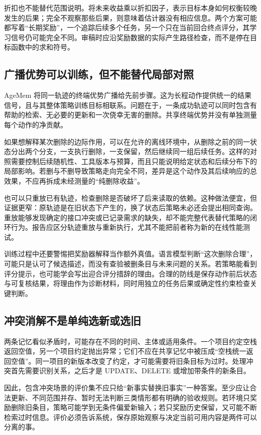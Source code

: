 折扣也不能替代范围说明。将未来收益乘以折扣因子，表示目标本身如何权衡较晚发生的后果；完全不观察那些后果，则意味着估计器没有相应信息。两个方案可能都写着“长期奖励”，一个追踪后续多个任务，另一个只在当前回合终点评分，其学习信号仍可能完全不同。审稿时应沿奖励数据的实际产生路径检查，而不是停在目标函数中的求和符号。

\subsection{广播优势可以训练，但不能替代局部对照}

AgeMem 将同一轨迹的终端优势广播给先前步骤\cite{agemem-2601}。这为长程动作提供统一的结果信号，且与其整体策略训练目标相联系。问题在于，一条成功轨迹可以同时包含有帮助的检索、无必要的更新和一次侥幸无害的删除。共享终端优势并没有单独测量每个动作的净贡献。

如果想解释某次删除的边际作用，可以在允许的离线环境中，从删除之前的同一状态分出两个分支，一支执行删除，一支保留，然后继续同一组后续任务。这样的对照需要控制后续随机性、工具版本与预算，而且只能说明给定状态和后续分布下的局部影响。若删与不删导致策略走向完全不同，差异是这个动作及其后续响应的总效果，不应再拆成未经测量的“纯删除收益”。

也可以只重放已有轨迹，检查删除是否破坏了后来读取的依赖。这种做法便宜，但证据更窄：原轨迹是在旧状态下产生的，换了状态后策略未必还会提出相同查询。重放能够发现确定的接口冲突或已记录需求的缺失，却不能完整代表替代策略的闭环行为。报告应区分轨迹重放与重新执行，尤其不能把前者称为新的在线性能测试。

训练过程中还要警惕把奖励器解释当作额外真值。语言模型判断“这次删除合理”，可能只是认可了候选描述，而没有查验被删条目与未来问题的关系。若策略能看到评分提示，也可能学会写出迎合评分措辞的理由。合理的防线是保存动作前后状态与可复核结果，将理由作为诊断材料，同时用独立的任务后果或确定性约束检查关键判断。

\subsection{冲突消解不是单纯选新或选旧}

两条记忆看似矛盾时，可能存在不同的时间、主体或适用条件。一个项目约定空栈返回空值，另一个项目约定抛出异常；它们不应在共享记忆中被压成“空栈统一返回空值”。同一项目的新版本改变了约定，才可能需要将旧条目标为过时。处理冲突首先需要识别关系，之后才是 UPDATE、DELETE 或增加带条件的新条目。

因此，包含冲突场景的评价集不应只给“新事实替换旧事实”一种答案。至少应让合法更新、不同范围并存、暂时无法判断三类情形都有明确的验收规则。若环境只奖励删除旧条目，策略可能学到无条件偏爱新输入；若只奖励历史保留，又可能不断检索过时信息。评价必须告诉系统，保存原始观察与决定当前可用内容是两件可以分离的事。

